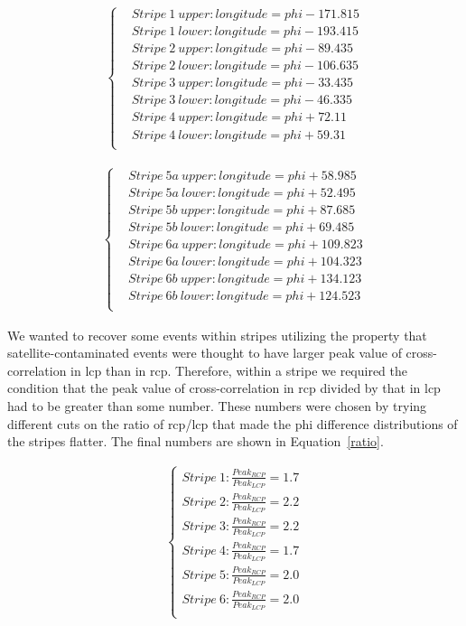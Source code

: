 \begin{align}
\begin{cases}
&  Stripe~1~upper: longitude = phi - 171.815 \\
&  Stripe~1~lower: longitude = phi - 193.415 \\
&  Stripe~2~upper: longitude = phi - 89.435 \\
&  Stripe~2~lower: longitude = phi - 106.635\\
&  Stripe~3~upper: longitude = phi - 33.435\\
&  Stripe~3~lower: longitude = phi - 46.335\\
&  Stripe~4~upper: longitude = phi + 72.11\\
&  Stripe~4~lower: longitude = phi + 59.31\\
\end{cases}
\label{cut_lines}
\end{align}

\begin{align}
\begin{cases}
&  Stripe~5a~upper: longitude = phi + 58.985\\
&  Stripe~5a~lower: longitude = phi + 52.495\\
&  Stripe~5b~upper: longitude = phi + 87.685\\
&  Stripe~5b~lower: longitude = phi + 69.485\\
&  Stripe~6a~upper: longitude = phi + 109.823\\
&  Stripe~6a~lower: longitude = phi + 104.323\\
&  Stripe~6b~upper: longitude = phi + 134.123\\
&  Stripe~6b~lower: longitude = phi + 124.523\\
\end{cases}
\label{cut_lines2}
\end{align}

We wanted to recover some events within stripes utilizing the property that satellite-contaminated events were thought to have larger peak value of cross-correlation in \gls{lcp} than in \gls{rcp}. 
Therefore, within a stripe we required the condition that the peak value of cross-correlation in \gls{rcp} divided by that in \gls{lcp} had to be greater than some number.
These numbers were chosen by trying different cuts on the ratio of \gls{rcp}/\gls{lcp} that made the phi difference distributions of the stripes flatter. The final numbers are shown in Equation~\ref{ratio}. 

\begin{align}
\begin{cases}
Stripe~1: \frac{Peak_{RCP}}{Peak_{LCP}} = 1.7\\
Stripe~2: \frac{Peak_{RCP}}{Peak_{LCP}} = 2.2\\
Stripe~3: \frac{Peak_{RCP}}{Peak_{LCP}} = 2.2\\
Stripe~4: \frac{Peak_{RCP}}{Peak_{LCP}} = 1.7\\
Stripe~5: \frac{Peak_{RCP}}{Peak_{LCP}} = 2.0\\
Stripe~6: \frac{Peak_{RCP}}{Peak_{LCP}} = 2.0\\
\end{cases}
\label{ratio}
\end{align}


